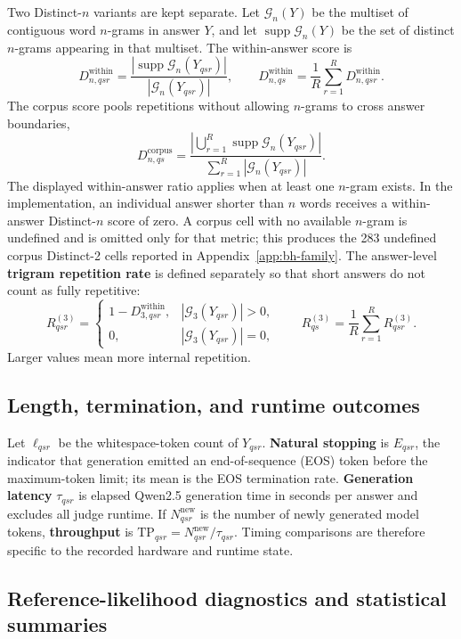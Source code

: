 \documentclass[11pt]{article}
\begin{document}
Two Distinct-$n$ variants are kept separate. Let $\mathcal G_n(Y)$ be the
multiset of contiguous word $n$-grams in answer $Y$, and let
$\operatorname{supp}\mathcal G_n(Y)$ be the set of distinct $n$-grams appearing
in that multiset. The within-answer score is
\[
 D^{\mathrm{within}}_{n,qsr}=
 \frac{|\operatorname{supp}\mathcal G_n(Y_{qsr})|}
 {|\mathcal G_n(Y_{qsr})|},\qquad
 D^{\mathrm{within}}_{n,qs}=\frac{1}{R}\sum_{r=1}^R
 D^{\mathrm{within}}_{n,qsr}.
\]
The corpus score pools repetitions without allowing $n$-grams to cross answer
boundaries,
\[
 D^{\mathrm{corpus}}_{n,qs}=
 \frac{\left|\bigcup_{r=1}^R
 \operatorname{supp}\mathcal G_n(Y_{qsr})\right|}
 {\sum_{r=1}^R|\mathcal G_n(Y_{qsr})|}.
\]
The displayed within-answer ratio applies when at least one $n$-gram exists.
In the implementation, an individual answer shorter than $n$ words receives a
within-answer Distinct-$n$ score of zero. A corpus cell with no available $n$-gram is
undefined and is omitted only for that metric; this produces the 283 undefined
corpus Distinct-2 cells reported in Appendix~\ref{app:bh-family}. The
answer-level \textbf{trigram repetition rate} is defined separately so that
short answers do not count as fully repetitive:
\[
 R^{(3)}_{qsr}=
 \begin{cases}
 1-D^{\mathrm{within}}_{3,qsr},&|\mathcal G_3(Y_{qsr})|>0,\\[2pt]
 0,&|\mathcal G_3(Y_{qsr})|=0,
 \end{cases}
 \qquad
 R^{(3)}_{qs}=\frac{1}{R}\sum_{r=1}^R R^{(3)}_{qsr}.
\]
Larger values mean more internal repetition.

\subsection{Length, termination, and runtime outcomes}

Let $\ell_{qsr}$ be the whitespace-token count of $Y_{qsr}$.
\textbf{Natural stopping} is $E_{qsr}$, the indicator that generation emitted an
end-of-sequence (EOS)
token before the maximum-token limit; its mean is the EOS termination rate.
\textbf{Generation latency} $\tau_{qsr}$ is elapsed Qwen2.5 generation time in
seconds per answer and excludes all judge runtime. If $N^{\mathrm{new}}_{qsr}$
is the number of newly generated model tokens, \textbf{throughput} is
$\mathrm{TP}_{qsr}=N^{\mathrm{new}}_{qsr}/\tau_{qsr}$. Timing comparisons are
therefore specific to the recorded hardware and runtime state.

\subsection{Reference-likelihood diagnostics and statistical summaries}
\end{document}
